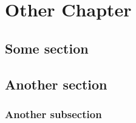 
\chapter{Other Chapter}

\section{Some section}

\lipsum

\section{Another section}

\lipsum

\subsection{Another subsection}

\lipsum